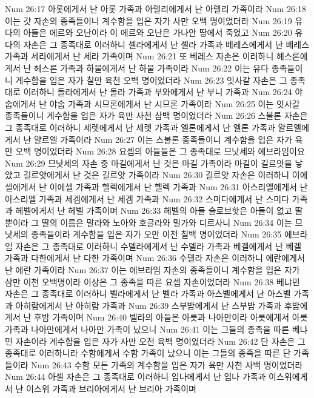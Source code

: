 Num 26:17  아롯에게서 난 아롯 가족과 아렐리에게서 난 아렐리 가족이라
Num 26:18  이는 갓 자손의 종족들이니 계수함을 입은 자가 사만 오백 명이었더라
Num 26:19  유다의 아들은 에르와 오난이라 이 에르와 오난은 가나안 땅에서 죽었고
Num 26:20  유다의 자손은 그 종족대로 이러하니 셀라에게서 난 셀라 가족과 베레스에게서 난 베레스 가족과 세라에게서 난 세라 가족이며
Num 26:21  또 베레스 자손은 이러하니 헤스론에게서 난 헤스론 가족과 하물에게서 난 하물 가족이라
Num 26:22  이는 유다 종족들이니 계수함을 입은 자가 칠만 육천 오백 명이었더라
Num 26:23  잇사갈 자손은 그 종족대로 이러하니 돌라에게서 난 돌라 가족과 부와에게서 난 부니 가족과
Num 26:24  야숩에게서 난 야숩 가족과 시므론에게서 난 시므론 가족이라
Num 26:25  이는 잇사갈 종족들이니 계수함을 입은 자가 육만 사천 삼백 명이었더라
Num 26:26  스불론 자손은 그 종족대로 이러하니 세렛에게서 난 세렛 가족과 엘론에게서 난 엘론 가족과 얄르엘에게서 난 얄르엘 가족이라
Num 26:27  이는 스불론 종족들이니 계수함을 입은 자가 육만 오백 명이었더라
Num 26:28  요셉의 아들들은 그 종족대로 므낫세와 에브라임이요
Num 26:29  므낫세의 자손 중 마길에게서 난 것은 마길 가족이라 마길이 길르앗을 낳았고 길르앗에게서 난 것은 길르앗 가족이라
Num 26:30  길르앗 자손은 이러하니 이에셀에게서 난 이에셀 가족과 헬렉에게서 난 헬렉 가족과
Num 26:31  아스리엘에게서 난 아스리엘 가족과 세겜에게서 난 세겜 가족과
Num 26:32  스미다에게서 난 스미다 가족과 헤벨에게서 난 헤벨 가족이며
Num 26:33  헤벨의 아들 슬로브핫은 아들이 없고 딸 뿐이라 그 딸의 이름은 말라와 노아와 호글라와 밀가와 디르사니
Num 26:34  이는 므낫세의 종족들이라 계수함을 입은 자가 오만 이천 칠백 명이었더라
Num 26:35  에브라임 자손은 그 종족대로 이러하니 수델라에게서 난 수델라 가족과 베겔에게서 난 베겔 가족과 다한에게서 난 다한 가족이며
Num 26:36  수델라 자손은 이러하니 에란에게서 난 에란 가족이라
Num 26:37  이는 에브라임 자손의 종족들이니 계수함을 입은 자가 삼만 이천 오백명이라 이상은 그 종족을 따른 요셉 자손이었더라
Num 26:38  베냐민 자손은 그 종족대로 이러하니 벨라에게서 난 벨라 가족과 아스벨에게서 난 아스벨 가족과 아히람에게서 난 아히람 가족과
Num 26:39  스부밤에게서 난 스부밤 가족과 후밤에게서 난 후밤 가족이며
Num 26:40  벨라의 아들은 아릇과 나아만이라 아릇에게서 아릇 가족과 나아만에게서 나아만 가족이 났으니
Num 26:41  이는 그들의 종족을 따른 베냐민 자손이라 계수함을 입은 자가 사만 오천 육백 명이었더라
Num 26:42  단 자손은 그 종족대로 이러하니라 수함에게서 수함 가족이 났으니 이는 그들의 종족을 따른 단 가족들이라
Num 26:43  수함 모든 가족의 계수함을 입은 자가 육만 사천 사백 명이었더라
Num 26:44  아셀 자손은 그 종족대로 이러하니 임나에게서 난 임나 가족과 이스위에게서 난 이스위 가족과 브리아에게서 난 브리아 가족이며
